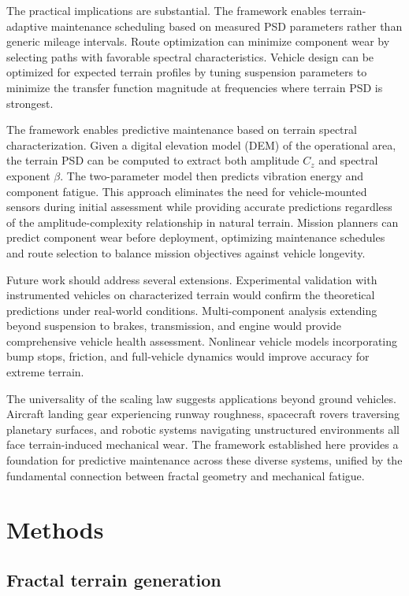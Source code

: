\documentclass[11pt]{article}
\begin{document}
The practical implications are substantial. The framework enables terrain-adaptive maintenance scheduling based on measured PSD parameters rather than generic mileage intervals. Route optimization can minimize component wear by selecting paths with favorable spectral characteristics. Vehicle design can be optimized for expected terrain profiles by tuning suspension parameters to minimize the transfer function magnitude at frequencies where terrain PSD is strongest.

The framework enables predictive maintenance based on terrain spectral characterization. Given a digital elevation model (DEM) of the operational area, the terrain PSD can be computed to extract both amplitude $C_z$ and spectral exponent $\beta$. The two-parameter model then predicts vibration energy and component fatigue. This approach eliminates the need for vehicle-mounted sensors during initial assessment while providing accurate predictions regardless of the amplitude-complexity relationship in natural terrain. Mission planners can predict component wear before deployment, optimizing maintenance schedules and route selection to balance mission objectives against vehicle longevity.

Future work should address several extensions. Experimental validation with instrumented vehicles on characterized terrain would confirm the theoretical predictions under real-world conditions. Multi-component analysis extending beyond suspension to brakes, transmission, and engine would provide comprehensive vehicle health assessment. Nonlinear vehicle models incorporating bump stops, friction, and full-vehicle dynamics would improve accuracy for extreme terrain.

The universality of the scaling law suggests applications beyond ground vehicles. Aircraft landing gear experiencing runway roughness, spacecraft rovers traversing planetary surfaces, and robotic systems navigating unstructured environments all face terrain-induced mechanical wear. The framework established here provides a foundation for predictive maintenance across these diverse systems, unified by the fundamental connection between fractal geometry and mechanical fatigue.


\section*{Methods}

\subsection*{Fractal terrain generation}
\end{document}
